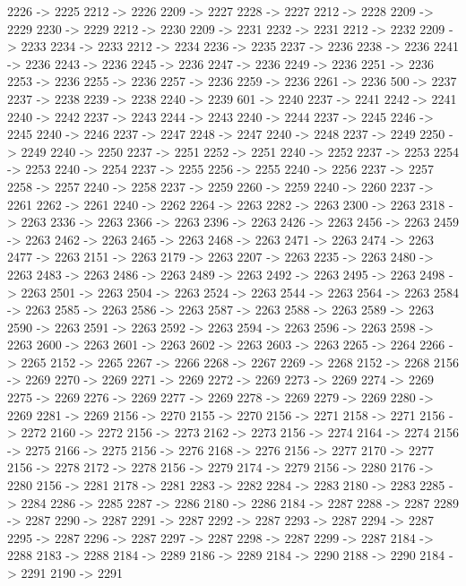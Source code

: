 {	2226 -> 2225
	2212 -> 2226
	2209 -> 2227
	2228 -> 2227
	2212 -> 2228
	2209 -> 2229
	2230 -> 2229
	2212 -> 2230
	2209 -> 2231
	2232 -> 2231
	2212 -> 2232
	2209 -> 2233
	2234 -> 2233
	2212 -> 2234
	2236 -> 2235
	2237 -> 2236
	2238 -> 2236
	2241 -> 2236
	2243 -> 2236
	2245 -> 2236
	2247 -> 2236
	2249 -> 2236
	2251 -> 2236
	2253 -> 2236
	2255 -> 2236
	2257 -> 2236
	2259 -> 2236
	2261 -> 2236
	500 -> 2237
	2237 -> 2238
	2239 -> 2238
	2240 -> 2239
	601 -> 2240
	2237 -> 2241
	2242 -> 2241
	2240 -> 2242
	2237 -> 2243
	2244 -> 2243
	2240 -> 2244
	2237 -> 2245
	2246 -> 2245
	2240 -> 2246
	2237 -> 2247
	2248 -> 2247
	2240 -> 2248
	2237 -> 2249
	2250 -> 2249
	2240 -> 2250
	2237 -> 2251
	2252 -> 2251
	2240 -> 2252
	2237 -> 2253
	2254 -> 2253
	2240 -> 2254
	2237 -> 2255
	2256 -> 2255
	2240 -> 2256
	2237 -> 2257
	2258 -> 2257
	2240 -> 2258
	2237 -> 2259
	2260 -> 2259
	2240 -> 2260
	2237 -> 2261
	2262 -> 2261
	2240 -> 2262
	2264 -> 2263
	2282 -> 2263
	2300 -> 2263
	2318 -> 2263
	2336 -> 2263
	2366 -> 2263
	2396 -> 2263
	2426 -> 2263
	2456 -> 2263
	2459 -> 2263
	2462 -> 2263
	2465 -> 2263
	2468 -> 2263
	2471 -> 2263
	2474 -> 2263
	2477 -> 2263
	2151 -> 2263
	2179 -> 2263
	2207 -> 2263
	2235 -> 2263
	2480 -> 2263
	2483 -> 2263
	2486 -> 2263
	2489 -> 2263
	2492 -> 2263
	2495 -> 2263
	2498 -> 2263
	2501 -> 2263
	2504 -> 2263
	2524 -> 2263
	2544 -> 2263
	2564 -> 2263
	2584 -> 2263
	2585 -> 2263
	2586 -> 2263
	2587 -> 2263
	2588 -> 2263
	2589 -> 2263
	2590 -> 2263
	2591 -> 2263
	2592 -> 2263
	2594 -> 2263
	2596 -> 2263
	2598 -> 2263
	2600 -> 2263
	2601 -> 2263
	2602 -> 2263
	2603 -> 2263
	2265 -> 2264
	2266 -> 2265
	2152 -> 2265
	2267 -> 2266
	2268 -> 2267
	2269 -> 2268
	2152 -> 2268
	2156 -> 2269
	2270 -> 2269
	2271 -> 2269
	2272 -> 2269
	2273 -> 2269
	2274 -> 2269
	2275 -> 2269
	2276 -> 2269
	2277 -> 2269
	2278 -> 2269
	2279 -> 2269
	2280 -> 2269
	2281 -> 2269
	2156 -> 2270
	2155 -> 2270
	2156 -> 2271
	2158 -> 2271
	2156 -> 2272
	2160 -> 2272
	2156 -> 2273
	2162 -> 2273
	2156 -> 2274
	2164 -> 2274
	2156 -> 2275
	2166 -> 2275
	2156 -> 2276
	2168 -> 2276
	2156 -> 2277
	2170 -> 2277
	2156 -> 2278
	2172 -> 2278
	2156 -> 2279
	2174 -> 2279
	2156 -> 2280
	2176 -> 2280
	2156 -> 2281
	2178 -> 2281
	2283 -> 2282
	2284 -> 2283
	2180 -> 2283
	2285 -> 2284
	2286 -> 2285
	2287 -> 2286
	2180 -> 2286
	2184 -> 2287
	2288 -> 2287
	2289 -> 2287
	2290 -> 2287
	2291 -> 2287
	2292 -> 2287
	2293 -> 2287
	2294 -> 2287
	2295 -> 2287
	2296 -> 2287
	2297 -> 2287
	2298 -> 2287
	2299 -> 2287
	2184 -> 2288
	2183 -> 2288
	2184 -> 2289
	2186 -> 2289
	2184 -> 2290
	2188 -> 2290
	2184 -> 2291
	2190 -> 2291
}
